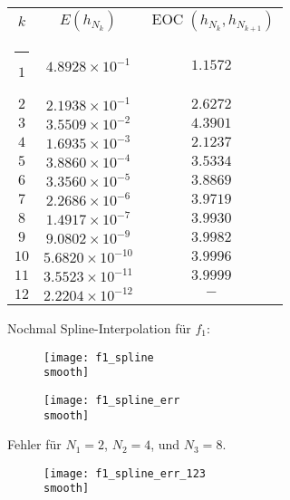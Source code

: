 \documentclass[]{scrartcl}
\makeatletter
\newcommand{\thickhline}{%
    \noalign {\ifnum 0=`}\fi \hrule height 1pt
    \futurelet \reserved@a \@xhline
}
\makeatother
\begin{document}
 	\renewcommand{\arraystretch}{1.2}
 	\begin{tabular}{|c|c|c|}\hline
 	$k$  & $E(h_{N_k})$ & $\operatorname{EOC}(h_{N_k},h_{N_{k+1}})$\\\thickhline
 	$1$  & $4.8928\times10^{-1}$ & $1.1572$\\\hline
 	$2$  & $2.1938\times10^{-1}$ & $2.6272$\\\hline
 	$3$  & $3.5509\times10^{-2}$ & $4.3901$\\\hline
 	$4$  & $1.6935\times10^{-3}$ & $2.1237$\\\hline
 	$5$  & $3.8860\times10^{-4}$ & $3.5334$\\\hline
 	$6$  & $3.3560\times10^{-5}$ & $3.8869$\\\hline
 	$7$  & $2.2686\times10^{-6}$ & $3.9719$\\\hline
 	$8$  & $1.4917\times10^{-7}$ & $3.9930$\\\hline
 	$9$  & $9.0802\times10^{-9}$ & $3.9982$\\\hline
 	$10$ & $5.6820\times10^{-10}$ & $3.9996$\\\hline
 	$11$ & $3.5523\times10^{-11}$ & $3.9999$\\\hline
 	$12$ & $2.2204\times10^{-12}$ & $-$\\\hline
 	\end{tabular}
 	
 	Nochmal Spline-Interpolation für $f_1$:
	\begin{figure}[h]
		\centering
		\begin{minipage}{0.5\textwidth}
			\texttt{[image: f1\_spline\\smooth]}
			\caption{}
		\end{minipage}
		\begin{minipage}{0.49\textwidth}
			\texttt{[image: f1\_spline\_err\\smooth]}
			\caption{}
		\end{minipage}
	\end{figure} 
	
	Fehler für $N_1=2$, $N_2=4$, und $N_3=8$.
 	
 	\begin{figure}[H]
 		\centering
		\texttt{[image: f1\_spline\_err\_123\\smooth]}
		\caption{}
 	\end{figure}
\end{document}
